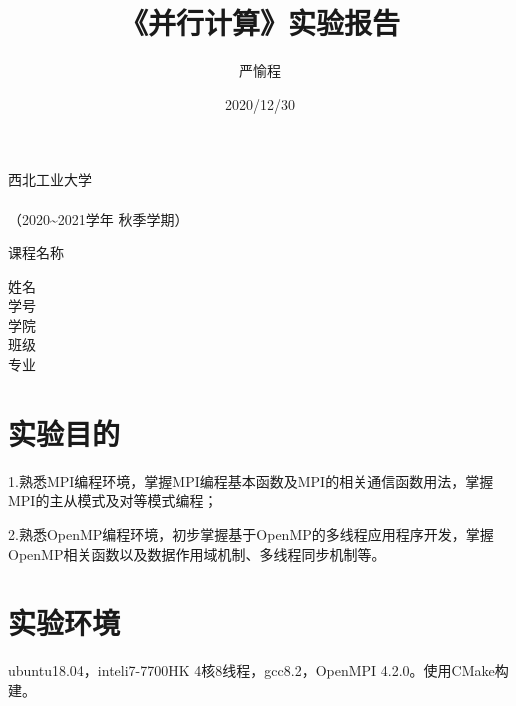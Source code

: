 \documentclass[10pt]{article}
\begin{document}
\begin{titlepage}
    \heiti
    \vspace*{64pt}
    \begin{center}
        \fontsize{56pt}{0} 西北工业大学\\
        \vspace*{36pt}
        \\
        \vspace*{48pt}
        \LARGE（2020\~{}2021学年 秋季学期）\\
        \vspace*{48pt}
    
        \LARGE 课程名称\ \ \ \underline{}\\
        \vspace*{72pt}
    
        \Large 姓名\ \ \underline{}\\
        \Large 学号\ \ \underline{}\\
        \Large 学院\ \ \underline{}\\
        \Large 班级\ \ \underline{}\\
        \Large 专业\ \ \underline{}\\
    \end{center}
\end{titlepage}

\tableofcontents

\title{\bf\Large 《并行计算》实验报告}
\date{2020/12/30}
\author{\small 严愉程}
\maketitle

\thispagestyle{fancy}

\section{实验目的}

1.熟悉MPI编程环境，掌握MPI编程基本函数及MPI的相关通信函数用法，掌握MPI的主从模式及对等模式编程；

2.熟悉OpenMP编程环境，初步掌握基于OpenMP的多线程应用程序开发，掌握OpenMP相关函数以及数据作用域机制、多线程同步机制等。 

\section{实验环境}
ubuntu18.04，inteli7-7700HK 4核8线程，gcc8.2，OpenMPI 4.2.0。使用CMake构建。
\end{document}
